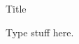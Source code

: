 ﻿\documentclass[11pt]{article}
\begin{document}
\begin{center}
\Large
Title
\end{center}
Type stuff here.
\end{document}
